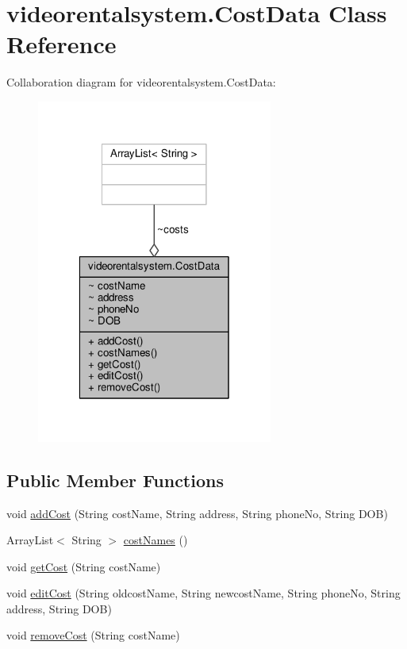 \hypertarget{classvideorentalsystem_1_1CostData}{\section{videorentalsystem.\-Cost\-Data Class Reference}
\label{classvideorentalsystem_1_1CostData}
}


Collaboration diagram for videorentalsystem.\-Cost\-Data\-:
\nopagebreak
\begin{figure}[H]
\begin{center}
\leavevmode
\includegraphics[width=220pt]{classvideorentalsystem_1_1CostData__coll__graph}
\end{center}
\end{figure}
\subsection*{Public Member Functions}
\begin{DoxyCompactItemize}
\item 
void \hyperlink{classvideorentalsystem_1_1CostData_a068ae4d12622331a36534360df8fa97d}{add\-Cost} (String cost\-Name, String address, String phone\-No, String D\-O\-B)
\item 
Array\-List$<$ String $>$ \hyperlink{classvideorentalsystem_1_1CostData_a49e580015e08b9dfe17f3d543717e68c}{cost\-Names} ()
\item 
void \hyperlink{classvideorentalsystem_1_1CostData_adec7aa3b57456c1962d4aa7f57741aef}{get\-Cost} (String cost\-Name)
\item 
void \hyperlink{classvideorentalsystem_1_1CostData_adaf884d21edc1c23d691f09c12f1ec2b}{edit\-Cost} (String oldcost\-Name, String newcost\-Name, String phone\-No, String address, String D\-O\-B)
\item 
void \hyperlink{classvideorentalsystem_1_1CostData_adcbc8c344fa0b7f1a6f2d0e428e65f6b}{remove\-Cost} (String cost\-Name)
\end{DoxyCompactItemize}


